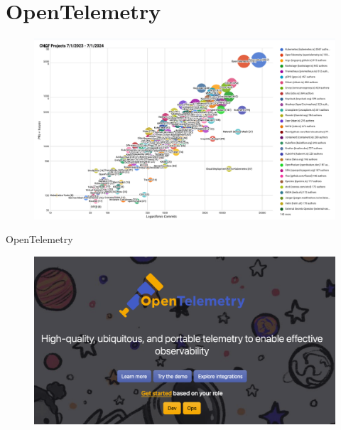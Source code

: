 \documentclass[aspectratio=169]{beamer}
\begin{document}
	{
		\section{OpenTelemetry}
	}
	
	\begin{frame}
		\begin{figure}
			\centering
			\includegraphics[width=0.9\linewidth]{Images/cncfprojects}
			\label{fig:cncfprojects}
		\end{figure}
	\end{frame}
	
	\begin{frame}{OpenTelemetry}
		\begin{figure}
			\centering
			\includegraphics[width=0.7\linewidth]{Images/opentelemetry}
			\label{fig:opentelemetry}
		\end{figure}
	\end{frame}
	
\end{document}

